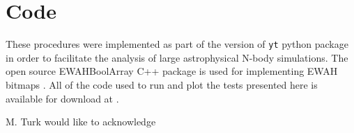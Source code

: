 \documentclass[apjl]{emulateapj}
\newcommand{\todo}[1]{{\color{red}{#1}}}
\begin{document}
\section{Code}\label{S:code}
These procedures were implemented as part of the \todo{X.X} version of {\tt yt} python package \citep{Turk20d11a} in order to facilitate the analysis of large astrophysical N-body simulations. The open source EWAHBoolArray C++ package is used for implementing EWAH bitmaps \citep{Lemire2010,Kaser2016}. All of the code used to run and plot the tests presented here is available for download at \todo{website}.

\acknowledgments
M. Turk would like to acknowledge \todo{grants, people, places}

\ifdraft
	
\else
	
\fi

\ifplacefig
\else
\fi

\newpage
\todo{To do:
\begin{itemize}
\item Improve conclusion
\item Acknowledgements
\item Non-uniform test data set?
\item Performance of runs on cosmology dataset?
\item Move figures to the end for submission
\end{itemize}
}
\end{document}
